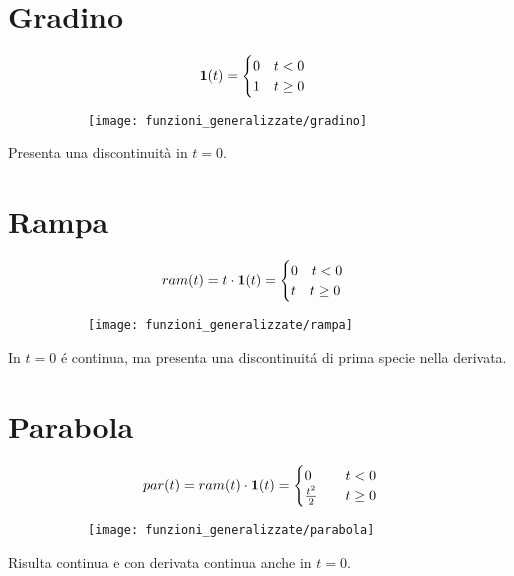 \documentclass[../main.tex]{subfiles}
\begin{document}
	\section{Gradino}
		\begin{figure}[H]
			\centering
			\begin{subfigure}{0.4\textwidth}
				\[
					\textbf{1}(t) = 
					\begin{cases}
						0 \quad t<0\\
						1 \quad t \geq 0
					\end{cases}
				\]
			\end{subfigure}
			\begin{subfigure}{0.4\textwidth}
				\texttt{[image: funzioni\_generalizzate/gradino]}
			\end{subfigure}
		\end{figure}
		Presenta una discontinuità in $t=0$.
		
	\section{Rampa}
		\begin{figure}[H]
			\centering
			\begin{subfigure}{0.4\textwidth}
				\[
					ram(t)= t \cdot \textbf{1}(t) =
					\begin{cases}
						0 \quad t<0\\
						t \quad t \geq 0			
					\end{cases}
				\]
			\end{subfigure}
			\begin{subfigure}{0.4\textwidth}
				\texttt{[image: funzioni\_generalizzate/rampa]}
			\end{subfigure}
		\end{figure}
		In $t=0$ \'e continua, ma presenta una discontinuit\'a di prima specie nella derivata.
		
	\section{Parabola}
		\begin{figure}[H]
			\centering
			\begin{subfigure}{0.4\textwidth}
				\[
					par(t)= ram(t) \cdot \textbf{1}(t) = 
					\begin{cases}
						0 \quad &t<0\\
						\frac{t^2}{2} \quad &t\geq 0
					\end{cases}
				\]
			\end{subfigure}
			\begin{subfigure}{0.4\textwidth}
				\texttt{[image: funzioni\_generalizzate/parabola]}
			\end{subfigure}
		\end{figure}
		Risulta continua e con derivata continua anche in $t=0$.	
		
\end{document}
